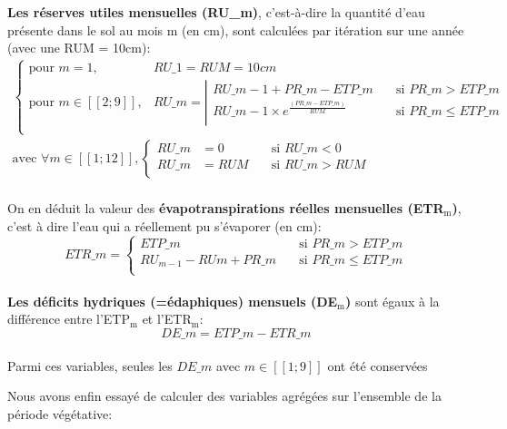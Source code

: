 \documentclass[a4paper,french,11pt]{article}
\newcommand{\down}[1]{$_{\text{#1}}$}
\begin{document}
\textbf{Les réserves utiles mensuelles (RU\_m)}, c'est-à-dire la quantité d'eau présente dans le sol au mois m (en cm), sont calculées par itération sur une année (avec une RUM = 10cm):
$$
\begin{array}{l}
	\left\{
		\begin{array}{ll}
			\text{pour }m=1,&RU\_{1}=RUM=10cm\\[15pt]
			\text{pour }m \in [\![2;9]\!],&RU\_m=
				\left|
					\begin{array}{ll} 
						RU\_m-1 + PR\_m - ETP\_m&\quad \text{si }PR\_m>ETP\_m\\[10pt]
						RU\_m-1\times e^{\frac{(PR\_m - ETP\_m)}{RUM}}&\quad \text{si }PR\_m\leq ETP\_m\\
					\end{array}
				\right. \\
			\end{array}
	\right. \\[45pt]
\text{avec }\forall m\in [\![1;12]\!],
	\left\{
		\begin{array}{lll}
			RU\_m&=0&\quad\text{si }RU\_m<0\\
			RU\_m&=RUM&\quad\text{si }RU\_m>RUM\\
		\end{array}
	\right.
\end{array}
$$
~\\
On en déduit la valeur des \textbf{évapotranspirations réelles mensuelles (ETR\down{m})}, c'est à dire l'eau qui a réellement pu s'évaporer (en cm):
$$
ETR\_m=
	\left\{
		\begin{array}{ll}
			ETP\_m&\quad\text{si }PR\_m>ETP\_m\\
			RU_{m-1}-RU{m}+PR\_m&\quad\text{si }PR\_m\leq ETP\_m\\
		\end{array}
	\right.
$$
~\\
\textbf{Les déficits hydriques (=édaphiques) mensuels (DE\down{m})} sont égaux à la différence entre l'ETP\down{m} et l'ETR\down{m}:
$$DE\_m=ETP\_m-ETR\_m$$
~\\

Parmi ces variables, seules les $DE\_m$ avec $m \in [\![1;9]\!]$ ont été conservées

Nous avons enfin essayé de calculer des variables agrégées sur l'ensemble de la période végétative: 
\end{document}
